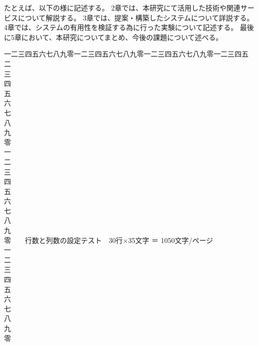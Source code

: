 \documentclass[a4paper,11pt,oneside,openany]{jsbook}
\begin{document}
たとえば、以下の様に記述する。
2章では、本研究にて活用した技術や関連サービスについて解説する。
3章では、提案・構築したシステムについて詳説する。
4章では、システムの有用性を検証する為に行った実験について記述する。
最後に5章において、本研究についてまとめ、今後の課題について述べる。


\newpage
\noindent
一二三四五六七八九零一二三四五六七八九零一二三四五六七八九零一二三四五\\
二\\
三\\
四\\
五\\
六\\
七\\
八\\
九\\
零\\
一\\
二\\
三\\
四\\
五\\
六\\
七\\
八\\
九\\
零　　行数と列数の設定テスト　30行×35文字 ＝ 1050文字/ページ\\
一\\
二\\
三\\
四\\
五\\
六\\
七\\
八\\
九\\
零

%
\end{document}
